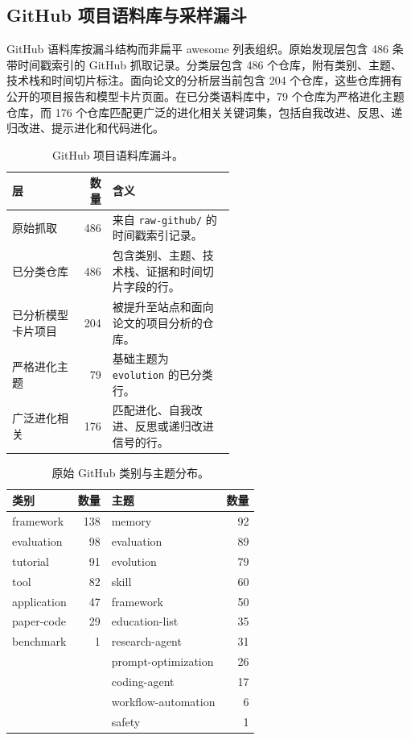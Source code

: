 
\subsection{GitHub 项目语料库与采样漏斗}
\label{subsec:github-project-corpus-sampling}

GitHub 语料库按漏斗结构而非扁平 awesome 列表组织。原始发现层包含 486 条带时间戳索引的 GitHub 抓取记录。分类层包含 486 个仓库，附有类别、主题、技术栈和时间切片标注。面向论文的分析层当前包含 204 个仓库，这些仓库拥有公开的项目报告和模型卡片页面。在已分类语料库中，79 个仓库为严格进化主题仓库，而 176 个仓库匹配更广泛的进化相关关键词集，包括自我改进、反思、递归改进、提示进化和代码进化。

\begin{table}[t]
\centering
\caption{GitHub 项目语料库漏斗。}
\label{tab:github-project-corpus-funnel}
\begin{tabular}{lrp{0.55\linewidth}}
\toprule
层 & 数量 & 含义 \\
\midrule
原始抓取 & 486 & 来自 \texttt{raw-github/} 的时间戳索引记录。 \\
已分类仓库 & 486 & 包含类别、主题、技术栈、证据和时间切片字段的行。 \\
已分析模型卡片项目 & 204 & 被提升至站点和面向论文的项目分析的仓库。 \\
严格进化主题 & 79 & 基础主题为 \texttt{evolution} 的已分类行。 \\
广泛进化相关 & 176 & 匹配进化、自我改进、反思或递归改进信号的行。 \\
\bottomrule
\end{tabular}
\end{table}

\begin{table}[t]
\centering
\caption{原始 GitHub 类别与主题分布。}
\label{tab:github-category-theme-distribution}
\begin{tabular}{lrlr}
\toprule
类别 & 数量 & 主题 & 数量 \\
\midrule
framework & 138 & memory & 92 \\
evaluation & 98 & evaluation & 89 \\
tutorial & 91 & evolution & 79 \\
tool & 82 & skill & 60 \\
application & 47 & framework & 50 \\
paper-code & 29 & education-list & 35 \\
benchmark & 1 & research-agent & 31 \\
 &  & prompt-optimization & 26 \\
 &  & coding-agent & 17 \\
 &  & workflow-automation & 6 \\
 &  & safety & 1 \\
\bottomrule
\end{tabular}
\end{table}

